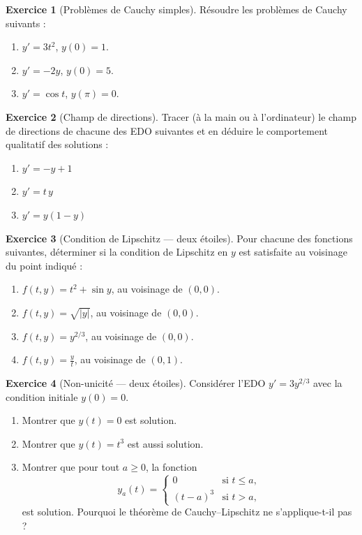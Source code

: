 \documentclass[12pt,a4paper,openany]{book}
\theoremstyle{definition}
\newtheorem{exercice}{Exercice}[chapter]
\theoremstyle{plain}
\theoremstyle{remark}
\newcommand{\abs}[1]{\left|#1\right|}
\begin{document}
\begin{exercice}[Problèmes de Cauchy simples]
\label{exo:ch1-cauchy-simples}
Résoudre les problèmes de Cauchy suivants :
\begin{enumerate}[label=(\alph*)]
\item $y' = 3t^2$, $y(0) = 1$.
\item $y' = -2y$, $y(0) = 5$.
\item $y' = \cos t$, $y(\pi) = 0$.
\end{enumerate}
\end{exercice}

\begin{exercice}[Champ de directions]
\label{exo:ch1-champ}
Tracer (à la main ou à l'ordinateur) le champ de directions de chacune des EDO suivantes et en déduire le comportement qualitatif des solutions :
\begin{enumerate}[label=(\alph*)]
\item $y' = -y + 1$
\item $y' = t\,y$
\item $y' = y(1-y)$
\end{enumerate}
\end{exercice}

\begin{exercice}[Condition de Lipschitz --- {\small deux étoiles}]
\label{exo:ch1-lipschitz}
Pour chacune des fonctions suivantes, déterminer si la condition de Lipschitz en $y$ est satisfaite au voisinage du point indiqué :
\begin{enumerate}[label=(\alph*)]
\item $f(t,y) = t^2 + \sin y$, au voisinage de $(0,0)$.
\item $f(t,y) = \sqrt{\abs{y}}$, au voisinage de $(0,0)$.
\item $f(t,y) = y^{2/3}$, au voisinage de $(0,0)$.
\item $f(t,y) = \frac{y}{t}$, au voisinage de $(0,1)$.
\end{enumerate}
\end{exercice}

\begin{exercice}[Non-unicité --- {\small deux étoiles}]
\label{exo:ch1-non-unicite}
Considérer l'EDO $y' = 3y^{2/3}$ avec la condition initiale $y(0) = 0$.
\begin{enumerate}[label=(\alph*)]
\item Montrer que $y(t) = 0$ est solution.
\item Montrer que $y(t) = t^3$ est aussi solution.
\item Montrer que pour tout $a \geq 0$, la fonction
\[
y_a(t) = \begin{cases} 0 & \text{si } t \leq a, \\ (t-a)^3 & \text{si } t > a, \end{cases}
\]
est solution. Pourquoi le théorème de Cauchy--Lipschitz ne s'applique-t-il pas ?
\end{enumerate}
\end{exercice}
\end{document}
